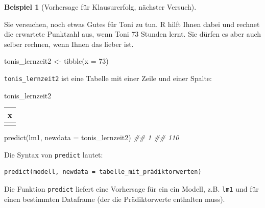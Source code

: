 \documentclass[
  letterpaper,
  twoside,
  open=any]{scrbook}
\newenvironment{Shaded}{\begin{snugshade}}{\end{snugshade}}
\newcommand{\AttributeTok}[1]{\textcolor[rgb]{0.40,0.45,0.13}{#1}}
\newcommand{\DecValTok}[1]{\textcolor[rgb]{0.68,0.00,0.00}{#1}}
\newcommand{\DocumentationTok}[1]{\textcolor[rgb]{0.37,0.37,0.37}{\textit{#1}}}
\newcommand{\FunctionTok}[1]{\textcolor[rgb]{0.28,0.35,0.67}{#1}}
\newcommand{\NormalTok}[1]{\textcolor[rgb]{0.00,0.23,0.31}{#1}}
\newcommand{\OtherTok}[1]{\textcolor[rgb]{0.00,0.23,0.31}{#1}}
\theoremstyle{definition}
\theoremstyle{definition}
\newtheorem{example}{Beispiel}[chapter]
\theoremstyle{definition}
\theoremstyle{remark}
\begin{document}
\begin{example}[Vorhersage für Klausurerfolg, nächster
Versuch]\protect\hypertarget{exm-noten6}{}\label{exm-noten6}

Sie versuchen, noch etwas Gutes für Toni zu tun. R hilft Ihnen dabei und
rechnet die erwartete Punktzahl aus, wenn Toni 73 Stunden lernt. Sie
dürfen es aber auch selber rechnen, wenn Ihnen das lieber ist.

\end{example}

\begin{Shaded}
\begin{Highlighting}[]
\NormalTok{tonis\_lernzeit2 }\OtherTok{\textless{}{-}} \FunctionTok{tibble}\NormalTok{(}\AttributeTok{x =} \DecValTok{73}\NormalTok{)  }
\end{Highlighting}
\end{Shaded}

\texttt{tonis\_lernzeit2} ist eine Tabelle mit einer Zeile und einer
Spalte:

\begin{Shaded}
\begin{Highlighting}[]
\NormalTok{tonis\_lernzeit2}
\end{Highlighting}
\end{Shaded}

\begin{longtable}[]{@{}r@{}}
\toprule\noalign{}
x \\
\midrule\noalign{}
\endhead
\bottomrule\noalign{}
\endlastfoot
73 \\
\end{longtable}

\begin{Shaded}
\begin{Highlighting}[]
\FunctionTok{predict}\NormalTok{(lm1, }\AttributeTok{newdata =}\NormalTok{ tonis\_lernzeit2)}
\DocumentationTok{\#\#   1 }
\DocumentationTok{\#\# 110}
\end{Highlighting}
\end{Shaded}

Die Syntax von \texttt{predict} lautet:

\begin{verbatim}
predict(modell, newdata = tabelle_mit_prädiktorwerten)
\end{verbatim}

Die Funktion \texttt{predict} liefert eine Vorhersage für ein ein
Modell, z.B. \texttt{lm1} und für einen bestimmten Dataframe (der die
Prädiktorwerte enthalten muss).
\end{document}
